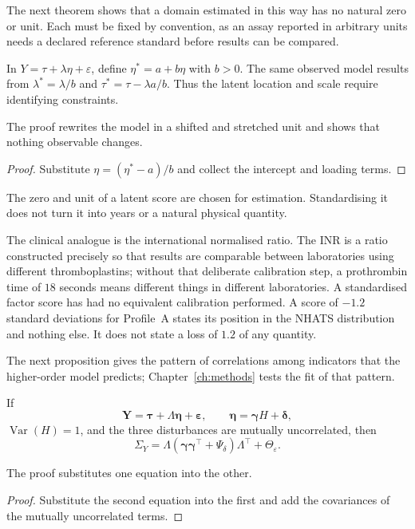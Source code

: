 The next theorem shows that a domain estimated in this way has no natural zero
or unit. Each must be fixed by convention, as an assay reported in arbitrary
units needs a declared reference standard before results can be compared.

\begin{theorem}
\label{thm:latent_scale}
In $Y=\tau+\lambda\eta+\varepsilon$, define
$\eta^*=a+b\eta$ with $b>0$. The same observed model results from
$\lambda^*=\lambda/b$ and $\tau^*=\tau-\lambda a/b$. Thus the latent
location and scale require identifying constraints.
\end{theorem}
The proof rewrites the model in a shifted and stretched unit and shows that
nothing observable changes.
\begin{proof}
Substitute $\eta=(\eta^*-a)/b$ and collect the intercept and loading terms.
\end{proof}

\begin{remark}
The zero and unit of a latent score are chosen for estimation. Standardising it
does not turn it into years or a natural physical quantity.
\end{remark}

The clinical analogue is the international normalised ratio. The INR is a ratio
constructed precisely so that results are comparable between laboratories using
different thromboplastins; without that deliberate calibration step, a
prothrombin time of $18$ seconds means different things in different
laboratories. A standardised factor score has had no equivalent calibration
performed. A score of $-1.2$ standard deviations for Profile~A states its position in
the NHATS distribution and nothing else. It does not state a loss of $1.2$ of
any quantity.

The next proposition gives the pattern of correlations among indicators that
the higher-order model predicts; Chapter~\ref{ch:methods} tests the fit of that
pattern.

\begin{proposition}
\label{prop:secondorder_cov}
If
\[
\mathbf Y=\boldsymbol\tau+\Lambda\boldsymbol\eta+\boldsymbol\varepsilon,
\qquad
\boldsymbol\eta=\boldsymbol\gamma H+\boldsymbol\delta,
\]
$\operatorname{Var}(H)=1$, and the three disturbances are mutually
uncorrelated, then
\[
\Sigma_Y=\Lambda(\boldsymbol\gamma\boldsymbol\gamma^\top+
\Psi_\delta)\Lambda^\top+\Theta_\varepsilon.
\]
\end{proposition}
The proof substitutes one equation into the other.
\begin{proof}
Substitute the second equation into the first and add the covariances of the
mutually uncorrelated terms.
\end{proof}

